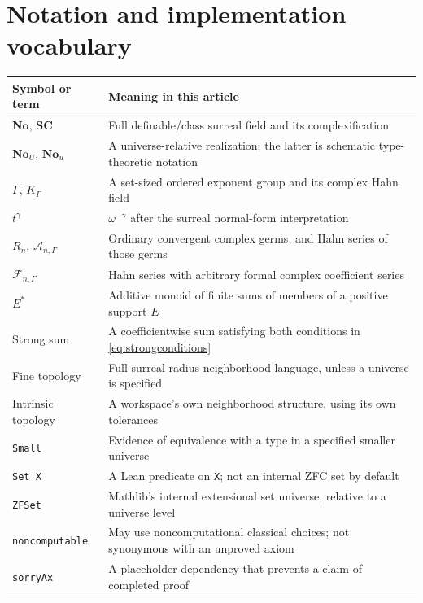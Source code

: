 \documentclass[11pt,letterpaper]{article}
\theoremstyle{definition}
\theoremstyle{remark}
\newcommand{\No}{\mathbf{No}}
\newcommand{\SC}{\mathbf{SC}}
\newcommand{\A}{\mathscr A}
\numberwithin{equation}{section}
\begin{document}
\section{Notation and implementation vocabulary}
\begin{longtable}{@{}L{0.25\textwidth}L{0.67\textwidth}@{}}
\toprule
Symbol or term & Meaning in this article\\
\midrule\endhead
\(\No\), \(\SC\) & Full definable/class surreal field and its complexification\\[0.3em]
\(\No_U\), \(\No_u\) & A universe-relative realization; the latter is schematic type-theoretic notation\\[0.3em]
\(\Gamma\), \(K_\Gamma\) & A set-sized ordered exponent group and its complex Hahn field\\[0.3em]
\(t^\gamma\) & \(\omega^{-\gamma}\) after the surreal normal-form interpretation\\[0.3em]
\(R_n\), \(\A_{n,\Gamma}\) & Ordinary convergent complex germs, and Hahn series of those germs\\[0.3em]
\(\mathscr F_{n,\Gamma}\) & Hahn series with arbitrary formal complex coefficient series\\[0.3em]
\(E^*\) & Additive monoid of finite sums of members of a positive support \(E\)\\[0.3em]
Strong sum & A coefficientwise sum satisfying both conditions in \eqref{eq:strongconditions}\\[0.3em]
Fine topology & Full-surreal-radius neighborhood language, unless a universe is specified\\[0.3em]
Intrinsic topology & A workspace's own neighborhood structure, using its own tolerances\\[0.3em]
\texttt{Small} & Evidence of equivalence with a type in a specified smaller universe\\[0.3em]
\texttt{Set X} & A Lean predicate on \texttt{X}; not an internal ZFC set by default\\[0.3em]
\texttt{ZFSet} & Mathlib's internal extensional set universe, relative to a universe level\\[0.3em]
\texttt{noncomputable} & May use noncomputational classical choices; not synonymous with an unproved axiom\\[0.3em]
\texttt{sorryAx} & A placeholder dependency that prevents a claim of completed proof\\
\bottomrule
\end{longtable}
\end{document}

